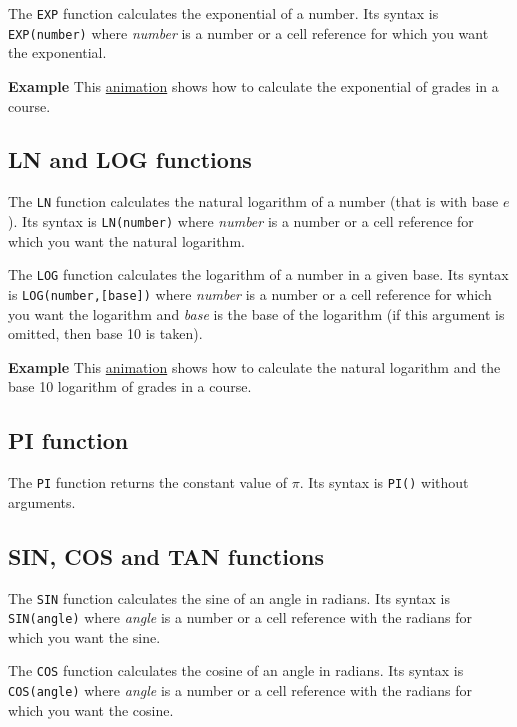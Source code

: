 The \texttt{EXP} function calculates the exponential of a number. Its syntax is \texttt{EXP(number)} where \emph{number} is a number or a cell reference for which you want the exponential.

\textbf{Example} This \href{http://aprendeconalf.es/office/excel/manual/img/example_function_exp.gif}{animation} shows how to calculate the exponential of grades in a course.

\subsection{LN and LOG functions}\hypertarget{ln-and-log-functions}{}\label{ln-and-log-functions}

The \texttt{LN} function calculates the natural logarithm of a number (that is with base $e$). Its syntax is \texttt{LN(number)} where \emph{number} is a number or a cell reference for which you want the natural logarithm.

The \texttt{LOG} function calculates the logarithm of a number in a given base. Its syntax is \texttt{LOG(number,[base])} where \emph{number} is a number or a cell reference for which you want the logarithm and \emph{base} is the base of the logarithm (if this argument is omitted, then base 10 is taken).

\textbf{Example} This \href{http://aprendeconalf.es/office/excel/manual/img/example_function_ln.gif}{animation} shows how to calculate the natural logarithm and the base 10 logarithm of grades in a course.

\subsection{PI function}\hypertarget{pi-function}{}\label{pi-function}

The \texttt{PI} function returns the constant value of $\pi$. Its syntax is \texttt{PI()} without arguments.

\subsection{SIN, COS and TAN functions}\hypertarget{sin-cos-and-tan-functions}{}\label{sin-cos-and-tan-functions}

The \texttt{SIN} function calculates the sine of an angle in radians. Its syntax is \texttt{SIN(angle)} where \emph{angle} is a number or a cell reference with the radians for which you want the sine.

The \texttt{COS} function calculates the cosine of an angle in radians. Its syntax is \texttt{COS(angle)} where \emph{angle} is a number or a cell reference with the radians for which you want the cosine.

